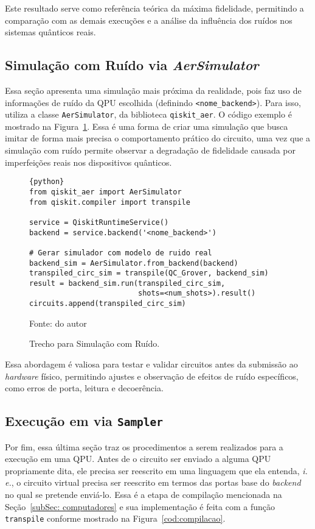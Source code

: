 Este resultado serve como referência teórica da máxima fidelidade, permitindo a comparação com as demais execuções e a análise da influência dos ruídos nos sistemas quânticos reais.

\subsection{Simulação com Ruído via \textit{AerSimulator}}
\label{subSec: simulacaoRuido}

Essa seção apresenta uma simulação mais próxima da realidade, pois faz uso de informações de ruído da QPU escolhida (definindo \texttt{<nome\_backend>}). Para isso, utiliza a classe \texttt{AerSimulator}, da biblioteca \texttt{qiskit\_aer}. O código exemplo é mostrado na Figura~\ref{cod:simulacaoRuido}. Essa é uma forma de criar uma simulação que busca imitar de forma mais precisa o comportamento prático do circuito, uma vez que a simulação com ruído permite observar a degradação de fidelidade causada por imperfeições reais nos dispositivos quânticos.

\begin{figure}[!htb]
\centering
\caption{Trecho para Simulação com Ruído.} 
\begin{lstlisting}{python}
from qiskit_aer import AerSimulator
from qiskit.compiler import transpile

service = QiskitRuntimeService()
backend = service.backend('<nome_backend>')

# Gerar simulador com modelo de ruido real
backend_sim = AerSimulator.from_backend(backend)
transpiled_circ_sim = transpile(QC_Grover, backend_sim)
result = backend_sim.run(transpiled_circ_sim, 
                         shots=<num_shots>).result()
circuits.append(transpiled_circ_sim)
\end{lstlisting}
{\small Fonte: do autor} 
\label{cod:simulacaoRuido} 
\end{figure}

Essa abordagem é valiosa para testar e validar circuitos antes da submissão ao \textit{hardware} físico, permitindo ajustes e observação de efeitos de ruído específicos, como erros de porta, leitura e decoerência.

\subsection{Execução em  via \texttt{Sampler}}
\label{subSec: execucaoQPU}

Por fim, essa última seção traz os procedimentos a serem realizados para a execução em uma QPU. Antes de o circuito ser enviado a alguma QPU propriamente dita, ele precisa ser reescrito em uma linguagem que ela entenda, \textit{i. e.}, o circuito virtual precisa ser reescrito em termos das portas base do \textit{backend} no qual se pretende enviá-lo. Essa é a etapa de compilação mencionada na Seção~\ref{subSec: computadores} e sua implementação é feita com a função \texttt{transpile} conforme mostrado na Figura~\ref{cod:compilacao}.

